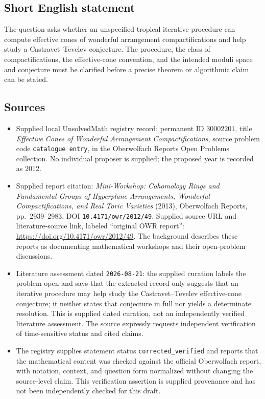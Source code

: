 \documentclass[11pt]{article}
\begin{document}
\subsection{Short English statement}
The question asks whether an unspecified tropical iterative procedure can compute effective cones of wonderful arrangement compactifications and help study a Castravet--Tevelev conjecture. The procedure, the class of compactifications, the effective-cone convention, and the intended moduli space and conjecture must be clarified before a precise theorem or algorithmic claim can be stated.
\subsection{Sources}
\begin{itemize}
\item Supplied local UnsolvedMath registry record: permanent ID \(30002201\), title \emph{Effective Cones of Wonderful Arrangement Compactifications}, source problem code \texttt{catalogue entry}, in the Oberwolfach Reports Open Problems collection. No individual proposer is supplied; the proposed year is recorded as 2012.
\item Supplied report citation: \emph{Mini-Workshop: Cohomology Rings and Fundamental Groups of Hyperplane Arrangements, Wonderful Compactifications, and Real Toric Varieties} (2013), Oberwolfach Reports, pp.~2939--2983, DOI \texttt{10.4171/owr/2012/49}. Supplied source URL and literature-source link, labeled ``original OWR report'': \url{https://doi.org/10.4171/owr/2012/49}. The background describes these reports as documenting mathematical workshops and their open-problem discussions.
\item Literature assessment dated \texttt{2026-08-21}: the supplied curation labels the problem open and says that the extracted record only suggests that an iterative procedure may help study the Castravet--Tevelev effective-cone conjecture; it neither states that conjecture in full nor yields a determinate resolution. This is supplied dated curation, not an independently verified literature assessment. The source expressly requests independent verification of time-sensitive status and cited claims.
\item The registry supplies statement status \texttt{corrected\_verified} and reports that the mathematical content was checked against the official Oberwolfach report, with notation, context, and question form normalized without changing the source-level claim. This verification assertion is supplied provenance and has not been independently checked for this draft.
\end{itemize}
\end{document}
